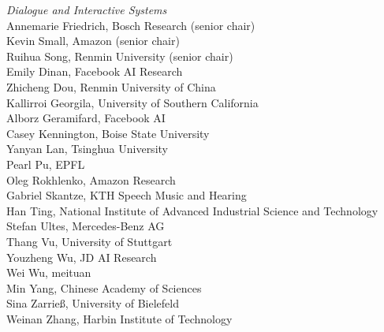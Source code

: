 \emph{Dialogue and Interactive Systems} \\
\hspace*{0.2in} Annemarie Friedrich, Bosch Research (senior chair)\\
\hspace*{0.2in} Kevin Small, Amazon (senior chair)\\
\hspace*{0.2in} Ruihua Song, Renmin University (senior chair)\\
\hspace*{0.2in} Emily Dinan, Facebook AI Research\\
\hspace*{0.2in} Zhicheng Dou, Renmin University of China\\
\hspace*{0.2in} Kallirroi Georgila, University of Southern California \\
\hspace*{0.2in} Alborz Geramifard, Facebook AI \\
\hspace*{0.2in} Casey Kennington, Boise State University\\
\hspace*{0.2in} Yanyan Lan, Tsinghua University\\
\hspace*{0.2in} Pearl Pu, EPFL\\
\hspace*{0.2in} Oleg Rokhlenko, Amazon Research\\
\hspace*{0.2in} Gabriel Skantze, KTH Speech Music and Hearing\\
\hspace*{0.2in} Han Ting, National Institute of Advanced Industrial Science and Technology\\
\hspace*{0.2in} Stefan Ultes, Mercedes-Benz AG\\
\hspace*{0.2in} Thang Vu, University of Stuttgart\\
\hspace*{0.2in} Youzheng Wu, JD AI Research\\
\hspace*{0.2in} Wei Wu, meituan\\
\hspace*{0.2in} Min Yang, Chinese Academy of Sciences\\
\hspace*{0.2in} Sina Zarrieß, University of Bielefeld\\
\hspace*{0.2in} Weinan Zhang, Harbin Institute of Technology\\

